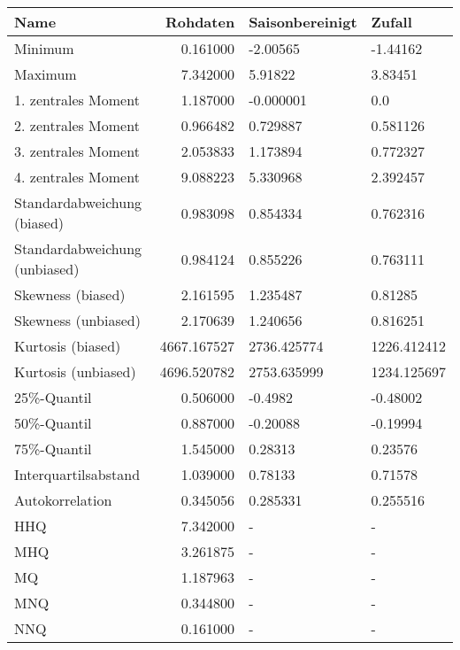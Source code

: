 \begin{tabular}{lrll}
\toprule
                         Name &    Rohdaten & Saisonbereinigt &       Zufall \\
\midrule
                      Minimum &    0.161000 &        -2.00565 &     -1.44162 \\
                      Maximum &    7.342000 &         5.91822 &      3.83451 \\
          1. zentrales Moment &    1.187000 &       -0.000001 &          0.0 \\
          2. zentrales Moment &    0.966482 &        0.729887 &     0.581126 \\
          3. zentrales Moment &    2.053833 &        1.173894 &     0.772327 \\
          4. zentrales Moment &    9.088223 &        5.330968 &     2.392457 \\
  Standardabweichung (biased) &    0.983098 &        0.854334 &     0.762316 \\
Standardabweichung (unbiased) &    0.984124 &        0.855226 &     0.763111 \\
            Skewness (biased) &    2.161595 &        1.235487 &      0.81285 \\
          Skewness (unbiased) &    2.170639 &        1.240656 &     0.816251 \\
            Kurtosis (biased) & 4667.167527 &     2736.425774 &  1226.412412 \\
          Kurtosis (unbiased) & 4696.520782 &     2753.635999 &  1234.125697 \\
                  25\%-Quantil &    0.506000 &         -0.4982 &     -0.48002 \\
                  50\%-Quantil &    0.887000 &        -0.20088 &     -0.19994 \\
                  75\%-Quantil &    1.545000 &         0.28313 &      0.23576 \\
         Interquartilsabstand &    1.039000 &         0.78133 &      0.71578 \\
              Autokorrelation &    0.345056 &        0.285331 &     0.255516 \\
                          HHQ &    7.342000 &               - &            - \\
                          MHQ &    3.261875 &               - &            - \\
                           MQ &    1.187963 &               - &            - \\
                          MNQ &    0.344800 &               - &            - \\
                          NNQ &    0.161000 &               - &            - \\
\bottomrule
\end{tabular}
